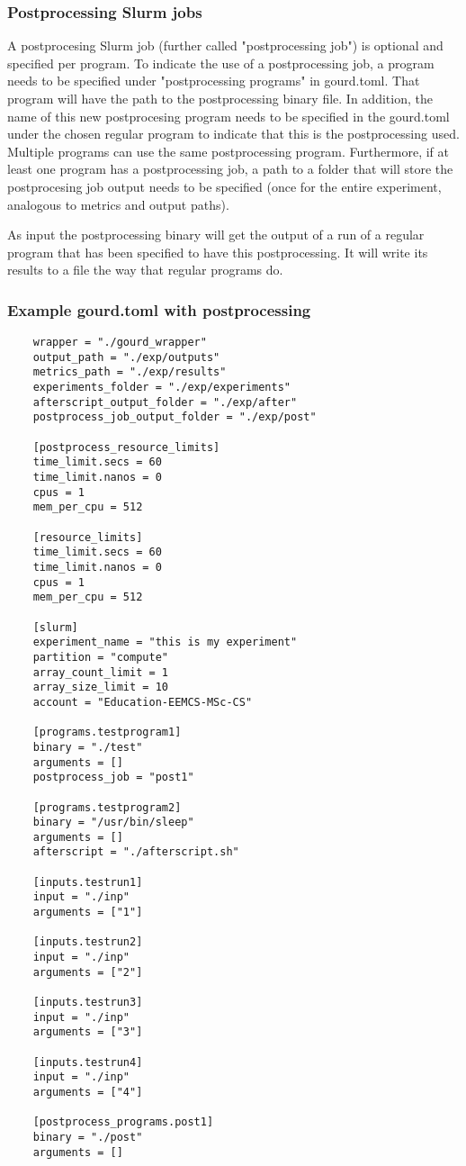 \subsubsection{Postprocessing Slurm jobs}
A postprocesing Slurm job (further called "postprocessing job") is optional and specified per program. To indicate 
the use of a postprocessing job, a program needs to be specified under "postprocessing programs" in gourd.toml. 
That program will have the path to the postprocessing binary file. In addition, the name of this new postprocesing 
program needs to be specified in the gourd.toml under the chosen regular program to indicate that this is the 
postprocessing used. Multiple programs can use the same postprocessing program. Furthermore, if at least one program 
has a postprocessing job, a path to a folder that will store the postprocesing job output needs to be specified 
(once for the entire experiment, analogous to metrics and output paths). 

As input the postprocessing binary will get the output of a run of a regular program that has been specified to have
this postprocessing. It will write its results to a file the way that regular programs do.

\subsubsection{Example gourd.toml with postprocessing}

\begin{verbatim}
    wrapper = "./gourd_wrapper"
    output_path = "./exp/outputs"
    metrics_path = "./exp/results"
    experiments_folder = "./exp/experiments"
    afterscript_output_folder = "./exp/after"
    postprocess_job_output_folder = "./exp/post"
    
    [postprocess_resource_limits]
    time_limit.secs = 60
    time_limit.nanos = 0
    cpus = 1
    mem_per_cpu = 512
    
    [resource_limits]
    time_limit.secs = 60
    time_limit.nanos = 0
    cpus = 1
    mem_per_cpu = 512
    
    [slurm]
    experiment_name = "this is my experiment"
    partition = "compute"
    array_count_limit = 1
    array_size_limit = 10
    account = "Education-EEMCS-MSc-CS"
    
    [programs.testprogram1]
    binary = "./test"
    arguments = []
    postprocess_job = "post1"
    
    [programs.testprogram2]
    binary = "/usr/bin/sleep"
    arguments = []
    afterscript = "./afterscript.sh"
    
    [inputs.testrun1]
    input = "./inp"
    arguments = ["1"]
    
    [inputs.testrun2]
    input = "./inp"
    arguments = ["2"]
    
    [inputs.testrun3]
    input = "./inp"
    arguments = ["3"]
    
    [inputs.testrun4]
    input = "./inp"
    arguments = ["4"]
    
    [postprocess_programs.post1]
    binary = "./post"
    arguments = []
\end{verbatim}

